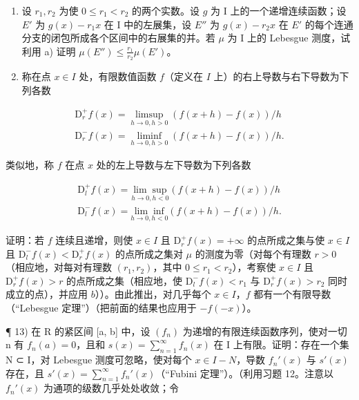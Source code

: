 \begin{enumerate}
\def\labelenumi{\alph{enumi})}
\setcounter{enumi}{1}
\item
  设 \(r_1, r_2\) 为使 \(0 \leqslant r_1 < r_2\) 的两个实数。设 \(g\) 为 I 上的一个递增连续函数；设 \(E'\) 为 \(g(x) - r_1x\) 在 I 中的左展集，设 \(E''\) 为 \(g(x) - r_2x\) 在 \(E'\) 的每个连通分支的闭包所成各个区间中的右展集的并。若 \(\mu\) 为 I 上的 Lebesgue 测度，试利用 a) 证明 \(\mu(E'') \leqslant \frac{r_1}{r_2} \mu(E')\)。
\item
  称在点 \(x \in I\) 处，有限数值函数 \(f\)（定义在 \(I\) 上）的右上导数与右下导数为下列各数
\end{enumerate}

\[
\begin{array}{l} \mathrm{D} _ {r} ^ {+} f (x) = \operatorname * {l i m s u p} _ {h \to 0,   h > 0} \left(f (x + h) - f (x)\right) / h \\ \mathrm{D} _ {r} ^ {-} f (x) = \operatorname * {l i m i n f} _ {h \to 0,   h > 0} \left(f (x + h) - f (x)\right) / h. \end{array}
\]

类似地，称 \(f\) 在点 \(x\) 处的左上导数与左下导数为下列各数

\[
\begin{array}{l}\mathrm{D} _ {l} ^ {+} f (x) = \underset {h \rightarrow 0, h <   0} {\lim \sup} \left(f (x + h) - f (x)\right) / h\\\mathrm{D} _ {l} ^ {-} f (x) = \underset {h \rightarrow 0, h <   0} {\lim \inf} \left(f (x + h) - f (x)\right) / h.\end{array}
\]

  证明：若 \(f\) 连续且递增，则使 \(x \in I\) 且 \(\mathrm{D}_r^+ f(x) = +\infty\) 的点所成之集与使 \(x \in I\) 且 \(\mathrm{D}_l^- f(x) < \mathrm{D}_r^+ f(x)\) 的点所成之集对 \(\mu\) 的测度为零（对每个有理数 \(r > 0\)（相应地，对每对有理数 \((r_1, r_2)\)，其中 \(0 \leqslant r_1 < r_2\)），考察使 \(x \in I\) 且 \(\mathrm{D}_r^+ f(x) > r\) 的点所成之集（相应地，使 \(\mathrm{D}_l^- f(x) < r_1\) 与 \(\mathrm{D}_r^+ f(x) > r_2\) 同时成立的点），并应用 \(b\)））。由此推出，对几乎每个 \(x \in I\)，\(f\) 都有一个有限导数（“Lebesgue 定理”）（把前面的结果也应用于 \(-f(-x)\)）。

¶ 13) 在 R 的紧区间 {[}a, b{]} 中，设 \((f_n)\) 为递增的有限连续函数序列，使对一切 n 有 \(f_n(a) = 0\)，且和 \(s(x) = \sum_{n=1}^{\infty} f_n(x)\) 在 I 上有限。证明：存在一个集 N ⊂ I，对 Lebesgue 测度可忽略，使对每个 \(x \in I - N\)，导数 \(f_n'(x)\) 与 \(s'(x)\) 存在，且 \(s'(x) = \sum_{n=1}^{\infty} f_n'(x)\)（“Fubini 定理”）。（利用习题 12。注意以 \(f_n'(x)\) 为通项的级数几乎处处收敛；令

